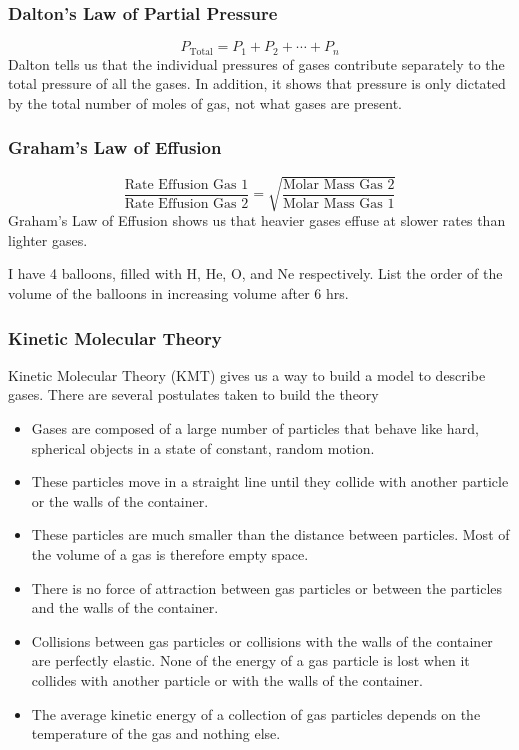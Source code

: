 \subsubsection{Dalton's Law of Partial Pressure}
\begin{equation}
    \boxed{P_{\text{Total}} = P_1+P_2+\cdots+P_n}
\end{equation}
Dalton tells us that the individual pressures of gases contribute separately to the total pressure of all the gases. In addition, it shows that pressure is only dictated by the total number of moles of gas, not what gases are present.

\subsubsection{Graham's Law of Effusion}
\begin{equation}
    \boxed{\frac{\text{Rate Effusion Gas 1}}{\text{Rate Effusion Gas 2}} = \sqrt{\frac{\text{Molar Mass Gas 2}}{\text{Molar Mass Gas 1}}}}
\end{equation}
Graham's Law of Effusion shows us that heavier gases effuse at slower rates than lighter gases. 

\begin{problem}
I have 4 balloons, filled with H, He, O, and Ne respectively. List the order of the volume of the balloons in increasing volume after 6 hrs.
\end{problem}

\subsubsection{Kinetic Molecular Theory}
Kinetic Molecular Theory (KMT) gives us a way to build a model to describe gases. There are several postulates taken to build the theory
\begin{itemize}
    \item Gases are composed of a large number of particles that behave like hard, spherical objects in a state of constant, random motion.
    \item These particles move in a straight line until they collide with another particle or the walls of the container.
    \item These particles are much smaller than the distance between particles. Most of the volume of a gas is therefore empty space.
    \item There is no force of attraction between gas particles or between the particles and the walls of the container.
    \item Collisions between gas particles or collisions with the walls of the container are perfectly elastic. None of the energy of a gas particle is lost when it collides with another particle or with the walls of the container.
    \item The average kinetic energy of a collection of gas particles depends on the temperature of the gas and nothing else.
\end{itemize}

